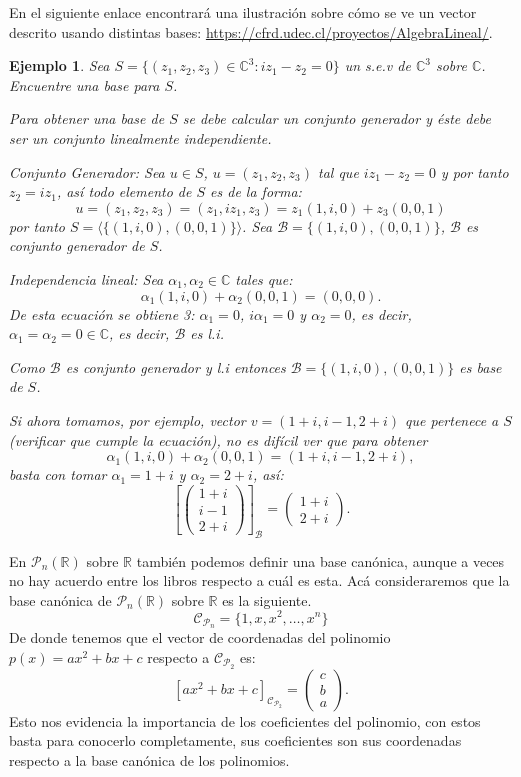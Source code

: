 \documentclass[12pt]{book}
\newtheorem{ejem}{Ejemplo}
\def\R{\mathbb{R}}
\def\C{\mathbb{C}}
\def\P{\mathcal{P}}
\def\B{\mathcal{B}}
\def\Ccal{\mathcal{C}}
\begin{document}
En el siguiente enlace encontrará una ilustración sobre cómo se ve un vector descrito usando distintas bases: \url{https://cfrd.udec.cl/proyectos/AlgebraLineal/}.

\begin{ejem}
Sea $S=\{(z_1,z_2,z_3)\in\C^3: iz_1-z_2=0\}$ un s.e.v de $\C^3$ sobre $\C$.
Encuentre una base para $S$.

{\em Para obtener una base de $S$ se debe calcular un conjunto generador y \'este debe ser un conjunto linealmente independiente.

\textsl{Conjunto Generador}: Sea $u\in S$, $u=(z_1,z_2,z_3)$ tal que $iz_1-z_2=0$ y por tanto $z_2=iz_1$, as\'i todo elemento de $S$ es de la forma:
$$u=(z_1,z_2,z_3)=(z_1,iz_1,z_3)=z_1(1,i,0)+z_3(0,0,1)$$
por tanto $S=\langle\{(1,i,0),(0,0,1)\}\rangle$. Sea $\B=\{(1,i,0),(0,0,1)\}$, $\B$ es conjunto generador de $S$.

\textsl{Independencia lineal}: Sea $\alpha_1,\alpha_2\in\C$ tales que:
$$\alpha_1(1,i,0)+\alpha_2(0,0,1)=(0,0,0).$$
De esta ecuación se obtiene 3: $\alpha_1=0$, $i\alpha_1=0$ y $\alpha_2=0$, es decir, $\alpha_1=\alpha_2=0\in\C$, es decir, $\B$ es l.i.

Como $\B$ es conjunto generador y l.i entonces $\B=\{(1,i,0),(0,0,1)\}$ es base de $S$.

Si ahora tomamos, por ejemplo, vector $v=(1+i,i-1,2+i)$ que pertenece a $S$ (verificar que cumple la ecuación), no es difícil ver que para obtener
$$\alpha_1(1,i,0)+\alpha_2(0,0,1)=(1+i,i-1,2+i),$$
basta con tomar $\alpha_1=1+i$ y $\alpha_2=2+i$, as\'i:
$$\left[\left(\begin{array}{c}1+i\\i-1\\2+i\end{array}\right)\right]_{\B}=\left(\begin{array}{c}1+i\\ 2+i \end{array}\right).$$
}
\end{ejem}


En $\P_n(\R)$ sobre $\R$ también podemos definir una base canónica, aunque a veces no hay acuerdo entre los libros respecto a cuál es esta.
Acá consideraremos que la base canónica de $\P_n(\R)$ sobre $\R$ es la siguiente.
$$\Ccal_{\P_n}=\{1,x,x^2,\dots,x^n\}$$
De donde tenemos que el vector de coordenadas del polinomio $p(x)=ax^2+bx+c$ respecto a $\Ccal_{\P_2}$ es:
$$\left[ax^2+bx+c\right]_{\Ccal_{\P_2}}=\left(\begin{array}{c} c\\b\\a \end{array}\right).$$
Esto nos evidencia la importancia de los coeficientes del polinomio, con estos basta para conocerlo completamente, sus coeficientes son sus coordenadas respecto a la base canónica de los polinomios.
\end{document}
